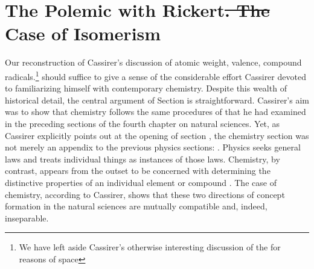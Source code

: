 \documentclass[submitted,12pt]{article}
\providecommand{\DIFadd}[1]{{\protect\color{blue}\uwave{#1}}} %
\providecommand{\DIFdel}[1]{{\protect\color{red}\sout{#1}}}                      %
\providecommand{\DIFaddbegin}{} %
\providecommand{\DIFaddend}{} %
\providecommand{\DIFdelbegin}{} %
\providecommand{\DIFdelend}{} %
\begin{document}


\section{The Polemic with Rickert\DIFdelbegin \DIFdel{. The }\DIFdelend \DIFaddbegin \DIFadd{: the }\DIFaddend Case of Isomerism}
\label{sec:rickert}



Our reconstruction of Cassirer's discussion of atomic weight, valence, compound radicals\etc.\footnote{We have left aside Cassirer's otherwise interesting discussion of the  for reasons of space } should suffice to give a sense of the considerable effort Cassirer devoted to familiarizing himself with contemporary chemistry. Despite this wealth of historical detail, the central argument of Section  is straightforward. Cassirer's aim was to show that chemistry follows the same procedures of   that he had examined in the preceding sections of the fourth chapter on natural sciences. Yet, as Cassirer explicitly points out at the opening of section , the chemistry section was not merely an appendix to the previous physics sections:  . Physics seeks general laws and treats individual things as instances of those laws. Chemistry, by contrast, appears from the outset to be concerned with determining the distinctive properties of an individual element or compound  . The case of chemistry, according to Cassirer, shows that these two directions of concept formation in the natural sciences are mutually compatible and, indeed, inseparable. 


\end{document}
